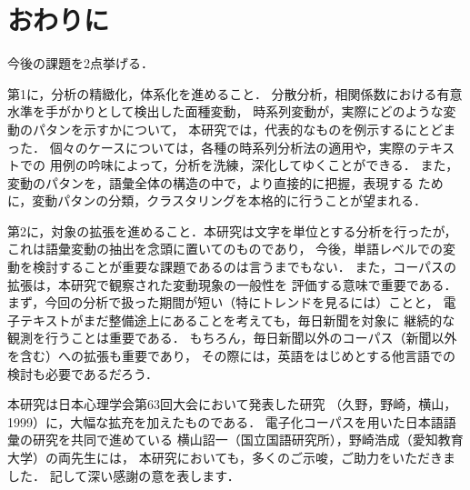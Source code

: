 \section{おわりに}

  今後の課題を2点挙げる．

  第1に，分析の精緻化，体系化を進めること．
分散分析，相関係数における有意水準を手がかりとして検出した面種変動，
時系列変動が，実際にどのような変動のパタンを示すかについて，
本研究では，代表的なものを例示するにとどまった．
個々のケースについては，各種の時系列分析法の適用や，実際のテキストでの
用例の吟味によって，分析を洗練，深化してゆくことができる．
また，変動のパタンを，語彙全体の構造の中で，より直接的に把握，表現する
ために，変動パタンの分類，クラスタリングを本格的に行うことが望まれる．

  第2に，対象の拡張を進めること．本研究は文字を単位とする分析を行ったが，
これは語彙変動の抽出を念頭に置いてのものであり，
今後，単語レベルでの変動を検討することが重要な課題であるのは言うまでもない．
また，コーパスの拡張は，本研究で観察された変動現象の一般性を
評価する意味で重要である．
まず，今回の分析で扱った期間が短い（特にトレンドを見るには）ことと，
電子テキストがまだ整備途上にあることを考えても，毎日新聞を対象に
継続的な観測を行うことは重要である．
もちろん，毎日新聞以外のコーパス（新聞以外を含む）への拡張も重要であり，
その際には，英語をはじめとする他言語での検討も必要であるだろう．




\acknowledgment

  本研究は日本心理学会第63回大会において発表した研究
（久野，野崎，横山，1999）に，大幅な拡充を加えたものである．
電子化コーパスを用いた日本語語彙の研究を共同で進めている
横山詔一（国立国語研究所），野崎浩成（愛知教育大学）の両先生には，
本研究においても，多くのご示唆，ご助力をいただきました．
記して深い感謝の意を表します．







\begin{biography}



\end{biography}




